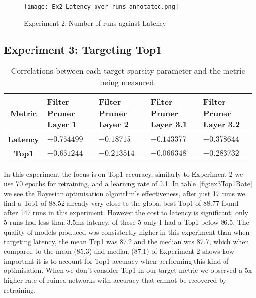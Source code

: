 \documentclass[../Dissertation.tex]{subfiles}
\begin{document}
\begin{figure}[H]
    \centering
    \texttt{[image: Ex2\_Latency\_over\_runs\_annotated.png]}
    \caption{Experiment 2. Number of runs against Latency}
\end{figure}

\subsection{Experiment 3: Targeting Top1}

\singlespacing
\begin{table}[H]
    \centering
    \begin{tabular}{@{}cp{26mm}p{26mm}p{26mm}p{26mm}@{}}
    \toprule
    \textbf{Metric}  & \textbf{Filter Pruner  Layer 1} & \textbf{Filter Pruner Layer 2} & \textbf{Filter Pruner Layer 3.1} & \textbf{Filter Pruner Layer 3.2} \\ \midrule
    \textbf{Latency} & $-0.764499$                        & $-0.18715$                      & $-0.143377$                         & $-0.378644$                         \\
    \textbf{Top1}    & $-0.661244$                        & $-0.213514$                      & $-0.066348$                        & $-0.283732$                        \\ \bottomrule
    \end{tabular}
    \caption{Correlations between each target sparsity parameter and the metric being measured.}
    \label{tab:Ex3PruneCorrelations}
\end{table}
\doublespacing

In this experiment the focus is on Top1 accuracy, similarly to Experiment 2 we use 70 epochs for retraining, and a learning rate of 0.1. 
In table~\ref{fig:ex3Top1Rate} we see the Bayesian optimisation algorithm's effectiveness, after just 17 runs we find a Top1 of $88.52$ already very close to the global best Top1 of $88.77$ found after 147 runs in this experiment.
However the cost to latency is significant, only 5 runs had less than $3.5$ms latency, of those 5 only 1 had a Top1 below 86.5.
The quality of models produced was consistently higher in this experiment than when targeting latency, the mean Top1 was 87.2 and the median was 87.7, which when compared to the mean (85.3) and median (87.1) of Experiment 2 shows how important it is to account for Top1 accuracy when performing this kind of optimisation.
When we don't consider Top1 in our target metric we observed a 5x higher rate of ruined networks with accuracy that cannot be recovered by retraining.
\end{document}
